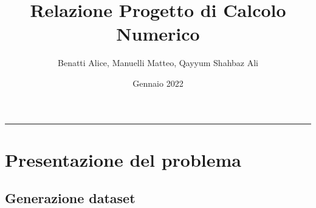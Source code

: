 \documentclass{article}
\title{\textbf{Relazione Progetto di Calcolo Numerico}}
\author{Benatti Alice, Manuelli Matteo, Qayyum Shahbaz Ali}
\date{Gennaio 2022}
\begin{document}
\maketitle
\addvspace{1cm}
\newpage
\tableofcontents
\newpage
\hrule
\begin{comment}
Relazione

1. Riportare e commentare i risultati ottenuti nei punti 2. 3. (e 4.) 
su un immagine del set creato e su altre due immagini in bianco e nero 
(fotografiche/mediche/astronomiche)
2. Riportare delle tabelle con le misure di PSNR e MSE ottenute al 
variare dei parametri (dimensione kernel, valore di sigma, la 
deviazione standard del rumore, il parametro di regolarizzazione). 
3. Calcolare sull’intero set di immagini medie e deviazione standard 
delle metriche per alcuni valori fissati dei parametri.  
4. Analizzare su 2 esecuzioni le proprietà dei metodi numerici 
utilizzati (gradiente coniugato e gradiente) in termini di numero di 
iterazioni, andamento dell’errore, della funzione obiettivo, norma del 
gradiente. 
\end{comment}

\section{Presentazione del problema}

    \subsection{Generazione dataset}
    
    
    

    
    
    

    
    \newpage


\end{document}
